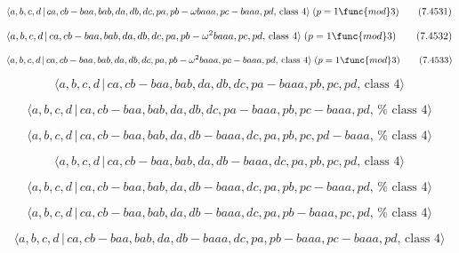 \documentclass[10pt]{article}
\begin{document}
\begin{equation}
\langle a,b,c,d\,|\,ca,cb-baa,bab,da,db,dc,pa,pb-\omega baaa,pc-baaa,pd,\,%
\text{class }4\rangle \;(p=1\func{mod}3)  \tag{7.4531}
\end{equation}

\begin{equation}
\langle a,b,c,d\,|\,ca,cb-baa,bab,da,db,dc,pa,pb-\omega ^{2}baaa,pc,pd,\,%
\text{class }4\rangle \;(p=1\func{mod}3)  \tag{7.4532}
\end{equation}

\begin{equation}
\langle a,b,c,d\,|\,ca,cb-baa,bab,da,db,dc,pa,pb-\omega
^{2}baaa,pc-baaa,pd,\,\text{class }4\rangle \;(p=1\func{mod}3)  \tag{7.4533}
\end{equation}

\begin{equation}
\langle a,b,c,d\,|\,ca,cb-baa,bab,da,db,dc,pa-baaa,pb,pc,pd,\,\text{class }%
4\rangle  \tag{7.4534}
\end{equation}

\begin{equation}
\langle a,b,c,d\,|\,ca,cb-baa,bab,da,db,dc,pa-baaa,pb,pc-baaa,pd,\,\text{%
class }4\rangle  \tag{7.4535}
\end{equation}

\begin{equation}
\langle a,b,c,d\,|\,ca,cb-baa,bab,da,db-baaa,dc,pa,pb,pc,pd-baaa,\,\text{%
class }4\rangle  \tag{7.4536}
\end{equation}

\begin{equation}
\langle a,b,c,d\,|\,ca,cb-baa,bab,da,db-baaa,dc,pa,pb,pc,pd,\,\text{class }%
4\rangle  \tag{7.4537}
\end{equation}

\begin{equation}
\langle a,b,c,d\,|\,ca,cb-baa,bab,da,db-baaa,dc,pa,pb,pc-baaa,pd,\,\text{%
class }4\rangle  \tag{7.4538}
\end{equation}

\begin{equation}
\langle a,b,c,d\,|\,ca,cb-baa,bab,da,db-baaa,dc,pa,pb-baaa,pc,pd,\,\text{%
class }4\rangle  \tag{7.4539}
\end{equation}

\begin{equation}
\langle a,b,c,d\,|\,ca,cb-baa,bab,da,db-baaa,dc,pa,pb-baaa,pc-baaa,pd,\,%
\text{class }4\rangle  \tag{7.4540}
\end{equation}
\end{document}
